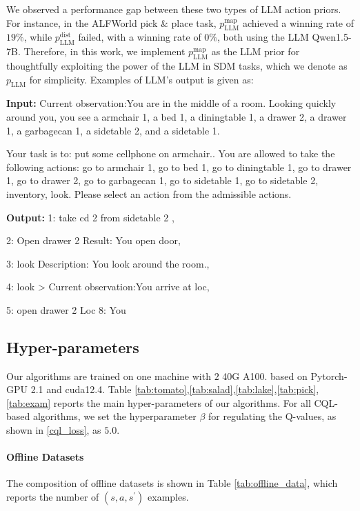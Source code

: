 We observed a performance gap between these two types of LLM action priors. For instance, in the ALFWorld pick \& place task, $p_{\text{LLM}}^{\text{map}}$ achieved a winning rate of $19\%$, while $p_{\text{LLM}}^{\text{dist}}$ failed, with a winning rate of $0\%$, both using the LLM Qwen1.5-7B. Therefore, in this work, we implement $p_{\text{LLM}}^{\text{map}}$ as the LLM prior for thoughtfully exploiting the power of the LLM in SDM tasks, which we denote as $p_{\text{LLM}}$ for simplicity.
Examples of LLM's output is given as:
\begin{tcolorbox}[title={For ALFWorld(Pick) from Qwen-1.5 7B}]
    
\textbf{Input:}
Current observation:You are in the middle of a room. Looking quickly around you, you see a armchair 1, a bed 1, a diningtable 1, a drawer 2, a drawer 1, a garbagecan 1, a sidetable 2, and a sidetable 1.

Your task is to: put some cellphone on armchair.. You are allowed to take the following actions: go to armchair 1, go to bed 1, go to diningtable 1, go to drawer 1, go to drawer 2, go to garbagecan 1, go to sidetable 1, go to sidetable 2, inventory, look.
Please select an action from the admissible actions. 

\textbf{Output:} 
1: take cd 2 from sidetable 2 , 

2: Open drawer 2 Result: You open door, 

3: look Description: You look around the room., 

4: look > Current observation:You arrive at loc, 

5: open drawer 2 Loc 8: You

\end{tcolorbox}
\subsection{Hyper-parameters}
Our algorithms are trained on one machine with $2$ 40G A100. based on Pytorch-GPU 2.1 and cuda12.4. Table \ref{tab:tomato},\ref{tab:salad},\ref{tab:lake},\ref{tab:pick},\ref{tab:exam} reports the main hyper-parameters of our algorithms. For all CQL-based algorithms, we set the hyperparameter $\beta$ for regulating the Q-values, as shown in \eq \ref{cql_loss}, as $5.0$.
\paragraph{Offline Datasets}
The composition of offline datasets is shown in Table \ref{tab:offline_data}, which reports the number of $(s,a,s^\prime)$ examples.

